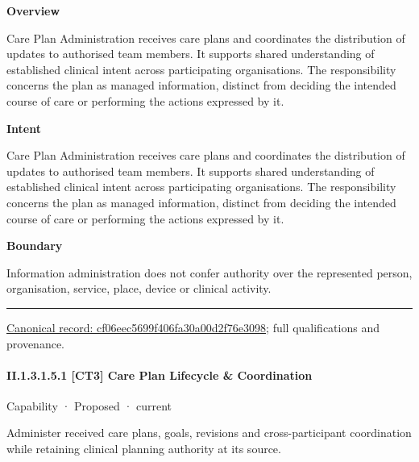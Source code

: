 \textbf{Overview}



Care Plan Administration receives care plans and coordinates the distribution of updates to authorised team members. It supports shared understanding of established clinical intent across participating organisations. The responsibility concerns the plan as managed information, distinct from deciding the intended course of care or performing the actions expressed by it.



\textbf{Intent}



Care Plan Administration receives care plans and coordinates the distribution of updates to authorised team members. It supports shared understanding of established clinical intent across participating organisations. The responsibility concerns the plan as managed information, distinct from deciding the intended course of care or performing the actions expressed by it.



\textbf{Boundary}



Information administration does not confer authority over the represented person, organisation, service, place, device or clinical activity.



\medskip\hrule\medskip

{\footnotesize \href{../../../../continuum/strategy/capability/cf06eec5699f406fa30a00d2f76e3098.md}{Canonical record: cf06eec5699f406fa30a00d2f76e3098}; full qualifications and provenance.}\par
\paragraph*{II.1.3.1.5.1 [CT3] Care Plan Lifecycle \& Coordination}
\label{navigation:II.1.3.1.5.1}

\label{element:4cb7db65392f4fab801d7794af4d4b29}
{\small Capability · Proposed · current}\par

Administer received care plans, goals, revisions and cross-participant coordination while retaining clinical planning authority at its source.



